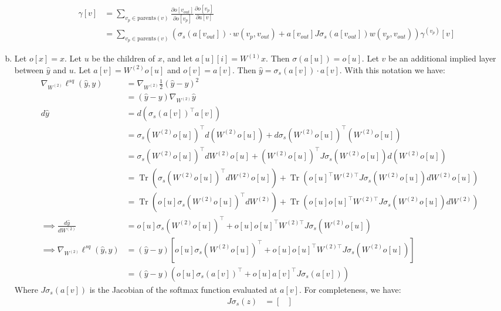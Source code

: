 \documentclass{amsart}
\DeclareMathOperator{\Tr}{Tr}
\theoremstyle{definition}
\begin{document}
\begin{enumerate}[(a)]
\begin{enumerate}[i.]
\begin{align*}
          \gamma[v] &= \sum_{v_p \in \text{parents}(v)} \frac{\partial o[v_{out}]}{\partial o[v_p]} \frac{\partial o[v_p]}{\partial a[v]} \\
          &= \sum_{v_p \in \text{parents}(v)} \left(\sigma_s(a[v_{out}]) \cdot w(v_p, v_{out}) + a[v_{out}] J \sigma_s(a[v_{out}]) w(v_p, v_{out})\right) \gamma^{(v_p)}[v]
        \end{align*}
      \end{enumerate}
  \item
      Let $o[x] = x$. Let $u$ be the children of $x$, and let $a[u][i] = W^{(1)}x$. Then $\sigma(a[u]) = o[u]$.
      Let $v$ be an additional implied layer between $\hat{y}$ and $u$. Let $a[v] = W^{(2)}o[u]$ and $o[v] = a[v]$. 
      Then $\hat{y} = \sigma_s(a[v]) \cdot a[v]$. With this notation we have:
      \begin{align*}
        \nabla_{W^{(2)}} \ell^{sq} (\hat{y}, y) &= \nabla_{W^{(2)}} \frac{1}{2}(\hat{y} - y)^2 \\
        &= (\hat{y} - y) \nabla_{W^{(2)}} \hat{y}\\
        d \hat{y} &=  d(\sigma_s(a[v])^\top a[v]) \\
        &= \sigma_s(W^{(2)}o[u])^\top d(W^{(2)}o[u]) + d \sigma_s(W^{(2)}o[u])^\top(W^{(2)}o[u])\\
        &= \sigma_s(W^{(2)}o[u])^\top dW^{(2)}o[u] + (W^{(2)}o[u])^\top J\sigma_s(W^{(2)}o[u]) d(W^{(2)}o[u])\\
        &= \Tr(\sigma_s(W^{(2)}o[u])^\top dW^{(2)}o[u]) + \Tr(o[u]^\top W^{(2)\top} J\sigma_s(W^{(2)}o[u]) dW^{(2)}o[u])\\
        &= \Tr(o[u] \sigma_s(W^{(2)}o[u])^\top dW^{(2)}) + \Tr(o[u]o[u]^\top W^{(2)\top} J\sigma_s(W^{(2)}o[u]) dW^{(2)})\\
        \implies \frac{d \hat{y}}{d W^{(2)}} &= o[u] \sigma_s(W^{(2)}o[u])^\top + o[u]o[u]^\top W^{(2)\top} J\sigma_s(W^{(2)}o[u])\\
        \implies \nabla_{W^{(2)}} \ell^{sq} (\hat{y}, y) &= (\hat{y} - y) \left[o[u] \sigma_s(W^{(2)}o[u])^\top +  o[u]o[u]^\top W^{(2)\top} J\sigma_s(W^{(2)}o[u])\right]\\
        &= (\hat{y} - y) \left(o[u] \sigma_s(a[v])^\top +  o[u]a[v]^\top J\sigma_s(a[v])\right)
      \end{align*}
      Where $J \sigma_s(a[v])$ is the Jacobian of the softmax function evaluated at $a[v]$. For completeness, we have:
      \begin{align*}
        J \sigma_s(z) &= \begin{bmatrix}

\end{bmatrix}
\end{align*}
\end{enumerate}
\end{document}
